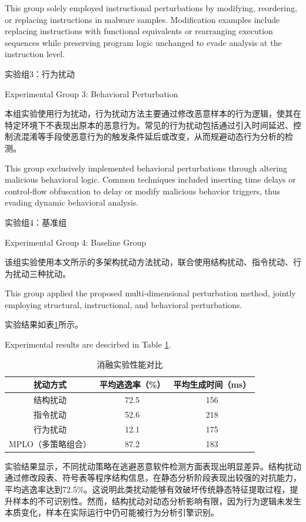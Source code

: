This group solely employed instructional perturbations by modifying, reordering, or replacing instructions in malware samples. Modification examples include replacing instructions with functional equivalents or rearranging execution sequences while preserving program logic unchanged to evade analysis at the instruction level.

实验组3：行为扰动

Experimental Group 3: Behavioral Perturbation

本组实验使用行为扰动，行为扰动方法主要通过修改恶意样本的行为逻辑，使其在特定环境下不表现出原本的恶意行为。常见的行为扰动包括通过引入时间延迟、控制流混淆等手段使恶意行为的触发条件延后或改变，从而规避动态行为分析的检测。

This group exclusively implemented behavioral perturbations through altering malicious behavioral logic. Common techniques included inserting time delays or control-flow obfuscation to delay or modify malicious behavior triggers, thus evading dynamic behavioral analysis.

实验组4：基准组

Experimental Group 4: Baseline Group

该组实验使用本文所示的多架构扰动方法扰动，联合使用结构扰动、指令扰动、行为扰动三种扰动。

This group applied the proposed multi-dimensional perturbation method, jointly employing structural, instructional, and behavioral perturbations.

实验结果如表\ref{tab:5.11}所示。

Experimental results are descirbed in Table \ref{tab:5.11}.

\begin{table}[htbp]
	\centering
	\caption{消融实验性能对比}
	\label{tab:5.11}
	\begin{tabular*}{0.9\textwidth}{@{\extracolsep{\fill}}ccc}
		\toprule
		扰动方式 & 平均逃逸率（\%） & 平均生成时间（ms） \\
		\midrule
		结构扰动 & 72.5 & 156 \\
		指令扰动 & 52.6 & 218 \\
		行为扰动 & 12.1 & 175 \\
		MPLO（多策略组合） & 87.2 & 183 \\
		\bottomrule
	\end{tabular*}
\end{table}

实验结果显示，不同扰动策略在逃避恶意软件检测方面表现出明显差异。结构扰动通过修改段表、符号表等程序结构信息，在静态分析阶段表现出较强的对抗能力，平均逃逸率达到72.5\%。这说明此类扰动能够有效破坏传统静态特征提取过程，提升样本的不可识别性。然而，结构扰动对动态分析影响有限，因为行为逻辑未发生本质变化，样本在实际运行中仍可能被行为分析引擎识别。

